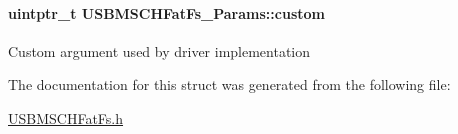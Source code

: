 \paragraph[{custom}]{\setlength{\rightskip}{0pt plus 5cm}uintptr\+\_\+t U\+S\+B\+M\+S\+C\+H\+Fat\+Fs\+\_\+\+Params\+::custom}\label{struct_u_s_b_m_s_c_h_fat_fs___params_a665e71dc3924d9c80b987da2e705a74b}
Custom argument used by driver implementation 

The documentation for this struct was generated from the following file\+:\begin{DoxyCompactItemize}
\item 
\hyperlink{_u_s_b_m_s_c_h_fat_fs_8h}{U\+S\+B\+M\+S\+C\+H\+Fat\+Fs.\+h}\end{DoxyCompactItemize}
